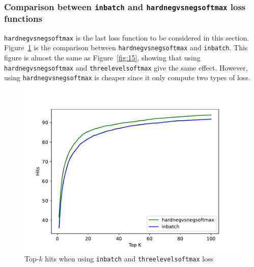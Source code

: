 \documentclass[12pt, sort&compress]{report}
\begin{document}
\subsubsection{Comparison between {\tt inbatch} and {\tt hardnegvsnegsoftmax} loss functions}
\label{sec:4.4.1.5}
{\tt hardnegvsnegsoftmax} is the last loss function to be considered in this section. Figure~\ref{fig:16} is the comparison between {\tt hardnegvsnegsoftmax} and {\tt inbatch}. This figure is almost the same as Figure~\ref{fig:15}, showing that using {\tt hardnegvsnegsoftmax} and {\tt threelevelsoftmax} give the same effect. However, using {\tt hardnegvsnegsoftmax} is cheaper since it only compute two types of loss.
\begin{figure}[!htbp]
	\centering
	\includegraphics[scale=.7]{images/PDF/experiments/inbatch_hardnegvsnegsoftmax_4-1-5.pdf}
	\caption{Top-$k$ hits when using {\tt inbatch} and {\tt threelevelsoftmax} loss}
	\label{fig:16}
\end{figure}
\end{document}

